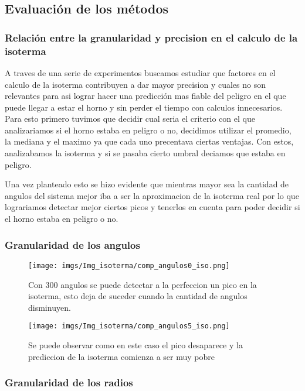 \subsection{Evaluación de los métodos}

\subsubsection{Relación entre la granularidad y precision en el calculo de la isoterma}

A traves de una serie de experimentos buscamos estudiar que factores en el calculo de la isoterma contribuyen a dar mayor precision y cuales no son relevantes para asi lograr hacer una predicción mas fiable del peligro en el que puede llegar a estar el horno y sin perder el tiempo con calculos innecesarios. Para esto primero tuvimos que decidir cual seria el criterio con el que analizariamos si el horno estaba en peligro o no, decidimos utilizar el promedio, la mediana y el maximo ya que cada uno precentava ciertas ventajas. Con estos, analizabamos la isoterma y si se pasaba cierto umbral deciamos que estaba en peligro.


Una vez planteado esto se hizo evidente que mientras mayor sea la cantidad de angulos del sistema mejor iba a ser la aproximacion de la isoterma real por lo que lograriamos detectar mejor ciertos picos y tenerlos en cuenta para poder decidir si el horno estaba en peligro o no.

\subsubsection{Granularidad de los angulos}

\begin{figure}[H]
\centering
\begin{minipage}{0.48\textwidth}
  \centering
    \texttt{[image: imgs/Img\_isoterma/comp\_angulos0\_iso.png]}
  \caption{\footnotesize{Con 300 angulos se puede detectar a la perfeccion un pico en la isoterma, esto deja de suceder cuando la cantidad de angulos disminuyen.}}
  \label{fig:Experimento1}
\end{minipage}%
\hspace{0.03\textwidth}
\begin{minipage}{0.48\textwidth}   
  \centering
    \texttt{[image: imgs/Img\_isoterma/comp\_angulos5\_iso.png]} 
  \caption{\footnotesize{Se puede observar como en este caso el pico desaparece y la prediccion de la isoterma comienza a ser muy pobre}}
  \label{fig:Experimento2}
\end{minipage}
\end{figure}


\subsubsection{Granularidad de los radios}
